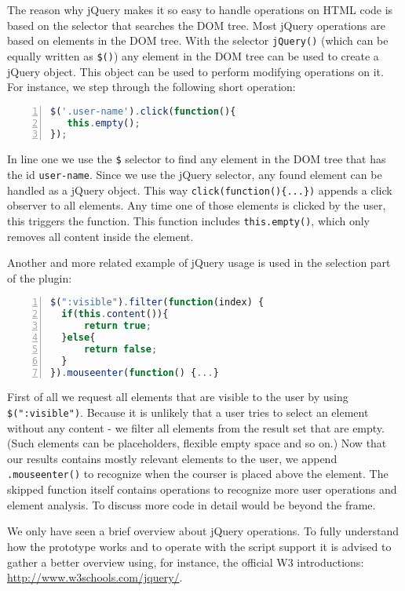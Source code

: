 The reason why jQuery makes it so easy to handle operations on HTML code is based on the selector that searches the DOM tree. Most jQuery operations are based on elements in the DOM tree. With the selector \verb+jQuery()+ (which can be equally written as \verb+$()+) any element in the DOM tree can be used to create a jQuery object. This object can be used to perform modifying operations on it. For instance, we step through the following short operation:
\begin{lstlisting}[language=JavaScript, numbers=left]
$('.user-name').click(function(){
   this.empty();
});
\end{lstlisting}

In line one we use the \verb+$+ selector to find any element in the DOM tree that has the id \verb+user-name+. Since we use the jQuery selector, any found element can be handled as a jQuery object. This way \verb+click(function(){...})+ appends a click observer to all elements. Any time one of those elements is clicked by the user, this triggers the function. This function includes \verb+this.empty()+, which only removes all content inside the element. 

Another and more related example of jQuery usage is used in the selection part of the plugin:
\begin{lstlisting}[language=JavaScript, numbers=left]
$(":visible").filter(function(index) {
  if(this.content()){
      return true;
  }else{
      return false;
  }
}).mouseenter(function() {...}
\end{lstlisting} 

First of all we request all elements that are visible to the user by using \verb+$(":visible")+. Because it is unlikely that a user tries to select an element without any content - we filter all elements from the result set that are empty. (Such elements can be placeholders, flexible empty space and so on.) Now that our results contains mostly relevant elements to the user, we append \verb+.mouseenter()+ to recognize when the courser is placed above the element. The skipped function itself contains operations to recognize more user operations and element analysis. To discuss more code in detail would be beyond the frame. 

We only have seen a brief overview about jQuery operations. To fully understand how the prototype works and to operate with the script support it is advised to gather a better overview using, for instance, the official W3 introductions: \url{http://www.w3schools.com/jquery/}. 

